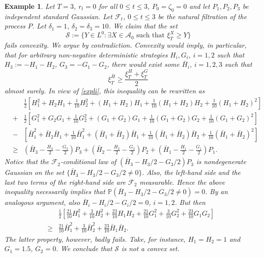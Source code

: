 \documentclass[a4paper]{article}
\newtheorem{example}[theorem]{Example}
\begin{document}
\begin{example}\label{notconvex}{\rm{} Let $T=3$, $r_{t}=0$ for all $0\leq t\leq 3$, $P_{0}=\zeta_{0}=0$ and let 
$P_{1},P_{2},P_{3}$ be independent standard Gaussian.
Let $\mathcal{F}_{t}$, $0\leq t\leq 3$ be the natural filtration of the process $P$.
Let $\delta_{1}=1$, $\delta_{2}=\delta_{3}=10$. We claim that the set
$$
\mathcal{S}:=\{Y\in L^{0}:\exists X\in\mathcal{A}_{0}\mbox{ such that }\xi^{X}_{T}\geq Y\}
$$
fails convexity. We argue by contradiction. 
Convexity would imply, in particular, that for arbitrary \emph{non-negative deterministic} 
strategies $H_{i},G_{i}$,
$i=1,2$ such that $H_{3}:=-H_{1}-H_{2}$, $G_{3}=-G_{1}-G_{2}$, there would exist some $\bar{H}_{i}$, $i=1,2,3$ such that
$$
\xi^{\bar{H}}_{T}\geq \frac{\xi^{H}_{T}+\xi^{G}_{T}}{2}
$$
almost surely. In view of \eqref{expli}, this inequality can be rewritten as
\begin{eqnarray}\nonumber
& & \frac{1}{2}\left[H_{1}^{2}+H_{2}H_{1}+\frac{1}{10}H_{2}^{2}+(H_{1}+H_{2})H_{1}+\frac{1}{10}(H_{1}+H_{2})H_{2}+
\frac{1}{10}(H_{1}+H_{2})^{2}
\right]\\ 
\nonumber &+& \frac{1}{2}\left[G_{1}^{2}+G_{2}G_{1}+\frac{1}{10}G_{2}^{2}+(G_{1}+G_{2})G_{1}+\frac{1}{10}(G_{1}+G_{2})G_{2}
+\frac{1}{10}(G_{1}+G_{2})^{2}\right]\\
\nonumber &-& \left[\bar{H}_{1}^{2}+\bar{H}_{2}\bar{H}_{1}+\frac{1}{10}\bar{H}_{1}^{2}+(\bar{H}_{1}+\bar{H}_{2})
\bar{H}_{1}+\frac{1}{10}(\bar{H}_{1}+\bar{H}_{2})\bar{H}_{2}+
\frac{1}{10}(\bar{H}_{1}+\bar{H}_{2})^{2}\right] \\
\nonumber &\geq&	{}
\left(\bar{H}_{3}-\frac{H_{3}}{2}-\frac{G_{3}}{2}\right)P_{3}+\left(\bar{H}_{2}-\frac{H_{2}}{2}-\frac{G_{2}}{2}\right)P_{2}+
\left(\bar{H}_{1}-\frac{H_{1}}{2}-\frac{G_{1}}{2}\right)P_{1}.
\end{eqnarray}
Notice that the $\mathcal{F}_{2}$-conditional law of $(\bar{H}_{3}-H_{3}/2-G_{3}/2)P_{3}$
is nondegenerate Gaussian on the set $\{\bar{H}_{3}-H_{3}/2-G_{3}/2\neq 0\}$. Also, the left-hand
side and the last two terms of the right-hand side are $\mathcal{F}_{2}$ measurable. Hence
the above inequality necessarily implies that $\mathbb{P}(\bar{H}_{3}-H_{3}/2-G_{3}/2\neq 0)=0$.
By an analogous argument, also $\bar{H}_{i}-H_{i}/2-G_{i}/2=0$, $i=1,2$. But then 
\begin{eqnarray*}
& & \frac{1}{2}\left[\frac{21}{10}H_{1}^{2}+\frac{3}{10}H_{2}^{2}+\frac{23}{10}H_{1}H_{2}+
\frac{21}{10}G_{1}^{2}+\frac{3}{10}G_{2}^{2}+\frac{23}{10}G_{1}G_{2}\right]\\ 
&\geq& 
\frac{21}{10}\bar{H}_{1}^{2}+\frac{3}{10}\bar{H}_{2}^{2}+\frac{23}{10}\bar{H}_{1}\bar{H}_{2}.
\end{eqnarray*}
The latter property, however, badly fails. Take, for instance, $H_{1}=H_{2}=1$ and $G_{1}=1.5$, $G_{2}=0$.
We conclude that $\mathcal{S}$ is \emph{not} a convex set.}
\end{example}
\end{document}

